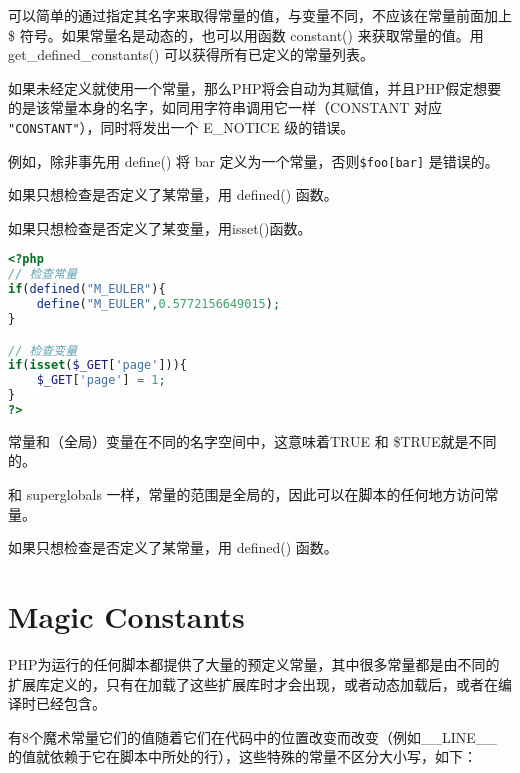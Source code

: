 可以简单的通过指定其名字来取得常量的值，与变量不同，不应该在常量前面加上 \$ 符号。如果常量名是动态的，也可以用函数 constant() 来获取常量的值。用 get\_defined\_constants() 可以获得所有已定义的常量列表。

如果未经定义就使用一个常量，那么PHP将会自动为其赋值，并且PHP假定想要的是该常量本身的名字，如同用字符串调用它一样（CONSTANT 对应 \texttt{"CONSTANT"}），同时将发出一个 E\_NOTICE 级的错误。

例如，除非事先用 define() 将 bar 定义为一个常量，否则\texttt{\$foo[bar]} 是错误的。

\begin{compactitem}
\item 如果只想检查是否定义了某常量，用 defined() 函数。
\item 如果只想检查是否定义了某变量，用isset()函数。
\end{compactitem}

\begin{lstlisting}[language=PHP]
<?php
// 检查常量
if(defined("M_EULER"){
	define("M_EULER",0.5772156649015);
}

// 检查变量
if(isset($_GET['page'])){
	$_GET['page'] = 1;
}
?>
\end{lstlisting}



常量和（全局）变量在不同的名字空间中，这意味着TRUE 和 \$TRUE就是不同的。

和 superglobals 一样，常量的范围是全局的，因此可以在脚本的任何地方访问常量。


如果只想检查是否定义了某常量，用 defined() 函数。











\section{Magic Constants}


PHP为运行的任何脚本都提供了大量的预定义常量，其中很多常量都是由不同的扩展库定义的，只有在加载了这些扩展库时才会出现，或者动态加载后，或者在编译时已经包含。

有8个魔术常量它们的值随着它们在代码中的位置改变而改变（例如\_\_LINE\_\_ 的值就依赖于它在脚本中所处的行），这些特殊的常量不区分大小写，如下：

